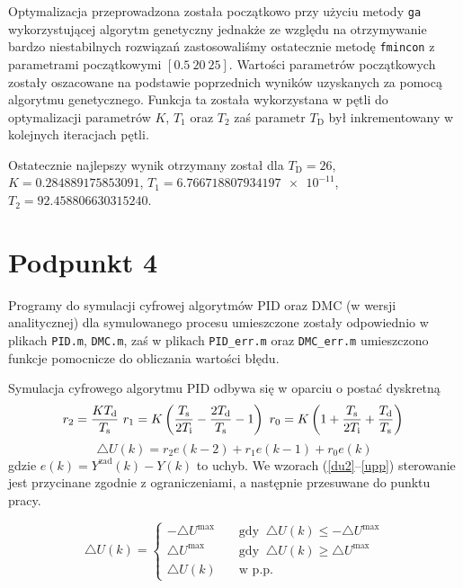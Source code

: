 Optymalizacja przeprowadzona została początkowo przy użyciu metody \verb+ga+ wykorzystującej algorytm genetyczny jednakże ze względu na otrzymywanie bardzo niestabilnych rozwiązań zastosowaliśmy ostatecznie metodę \verb+fmincon+ z parametrami początkowymi $[\num{0,5} ~ 20 ~ 25]$. Wartości parametrów początkowych zostały oszacowane na podstawie poprzednich wyników uzyskanych za pomocą algorytmu genetycznego. Funkcja ta została wykorzystana w pętli do optymalizacji parametrów $K$, $T_1$ oraz $T_2$ zaś parametr $T_{\mathrm{D}}$ był inkrementowany w kolejnych iteracjach pętli.

Ostatecznie najlepszy wynik otrzymany został dla $T_{\mathrm{D}}=26$, $K=\num{0.284889175853091}$, $T_1=\num{6.766718807934197e-11}$, $T_2=\num{92.458806630315240}$.

\chapter{Podpunkt 4}
Programy do symulacji cyfrowej algorytmów PID oraz DMC (w wersji analitycznej) dla symulowanego procesu umieszczone zostały odpowiednio w plikach \verb+PID.m+, \verb+DMC.m+, zaś w plikach \verb+PID_err.m+ oraz \verb+DMC_err.m+ umieszczono funkcje pomocnicze do obliczania wartości błędu.









Symulacja cyfrowego algorytmu PID odbywa się w oparciu o postać dyskretną
\begin{equation}
r_2 = \frac{K T_{\mathrm{d}}}{T_{\mathrm{s}}} \
r_1 = K \left( \frac{T_{\mathrm{s}}}{2 T_{\mathrm{i}}} - \frac{2 T_{\mathrm{d}}}{T_{\mathrm{s}}} - 1 \right) \
r_0 = K \left( 1 + \frac{T_{\mathrm{s}}}{2 T_{\mathrm{i}}} + \frac{T_{\mathrm{d}}}{T_{\mathrm{s}}} \right) \\
\label{r_t}
\end{equation}
\begin{equation}
\triangle U(k) = r_2 e(k-2) + r_1 e(k-1) + r_0 e(k)
\label{du}
\end{equation}
gdzie $e(k)=Y^{\mathrm{zad}}(k) - Y(k)$ to uchyb. We wzorach (\ref{du2}--\ref{upp}) sterowanie jest przycinane zgodnie z ograniczeniami, a następnie przesuwane do punktu pracy.

\begin{equation}
\triangle U(k) = 
\begin{cases}
-\triangle U^{\mathrm{max}} &\quad \textrm{gdy } \ \triangle U(k) \le -\triangle U^{\mathrm{max}} \\
\triangle U^{\mathrm{max}} &\quad \textrm{gdy } \ \triangle U(k) \ge \triangle U^{\mathrm{max}}  \\
\triangle U(k) &\quad \textrm{w p.p.}
\end{cases}
\label{du2}
\end{equation}

